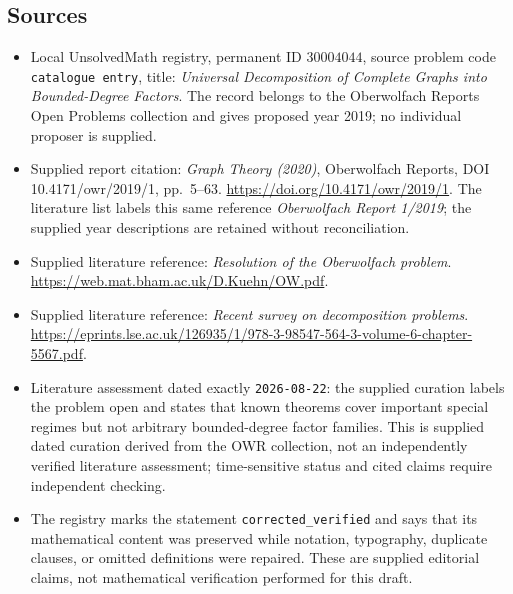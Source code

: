 \documentclass[11pt]{article}
\begin{document}
\subsection{Sources}
\begin{itemize}
\item Local UnsolvedMath registry, permanent ID \(30004044\), source problem code \texttt{catalogue entry}, title: \emph{Universal Decomposition of Complete Graphs into Bounded-Degree Factors}. The record belongs to the Oberwolfach Reports Open Problems collection and gives proposed year 2019; no individual proposer is supplied.
\item Supplied report citation: \emph{Graph Theory (2020)}, Oberwolfach Reports, DOI 10.4171/owr/2019/1, pp.~5--63. \url{https://doi.org/10.4171/owr/2019/1}. The literature list labels this same reference \emph{Oberwolfach Report 1/2019}; the supplied year descriptions are retained without reconciliation.
\item Supplied literature reference: \emph{Resolution of the Oberwolfach problem}. \url{https://web.mat.bham.ac.uk/D.Kuehn/OW.pdf}.
\item Supplied literature reference: \emph{Recent survey on decomposition problems}. \url{https://eprints.lse.ac.uk/126935/1/978-3-98547-564-3-volume-6-chapter-5567.pdf}.
\item Literature assessment dated exactly \texttt{2026-08-22}: the supplied curation labels the problem open and states that known theorems cover important special regimes but not arbitrary bounded-degree factor families. This is supplied dated curation derived from the OWR collection, not an independently verified literature assessment; time-sensitive status and cited claims require independent checking.
\item The registry marks the statement \texttt{corrected\_verified} and says that its mathematical content was preserved while notation, typography, duplicate clauses, or omitted definitions were repaired. These are supplied editorial claims, not mathematical verification performed for this draft.
\end{itemize}
\end{document}
